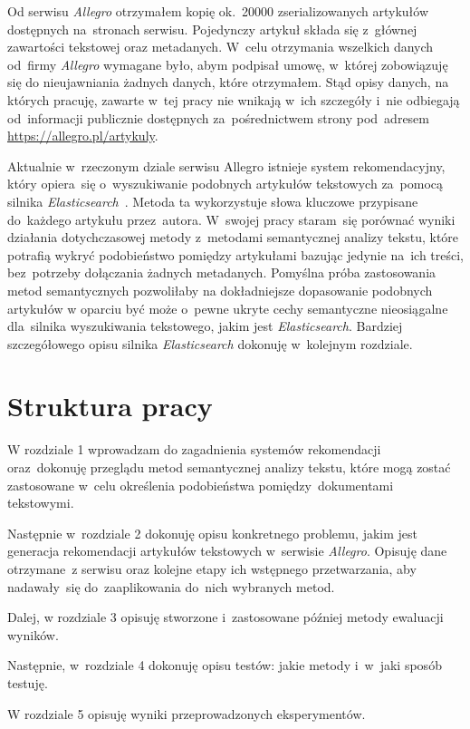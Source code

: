 \documentclass[pl]{minipw} %
\begin{document}
Od serwisu \textit{Allegro} otrzymałem kopię ok.~20000 zserializowanych artykułów dostępnych na~stronach serwisu. Pojedynczy artykuł składa się z~głównej zawartości tekstowej oraz metadanych. W~celu otrzymania wszelkich danych od~firmy \textit{Allegro} wymagane było, abym podpisał umowę, w~której zobowiązuję się do nieujawniania żadnych danych, które otrzymałem. Stąd opisy danych, na których pracuję, zawarte w~tej pracy nie wnikają w~ich szczegóły i~nie odbiegają od~informacji publicznie dostępnych za~pośrednictwem strony pod~adresem \url{https://allegro.pl/artykuly}.

Aktualnie w~rzeczonym dziale serwisu Allegro istnieje system rekomendacyjny, który opiera~się o~wyszukiwanie podobnych artykułów tekstowych za~pomocą silnika \textit{Elasticsearch}~\cite{elastic}. Metoda ta wykorzystuje słowa kluczowe przypisane do~każdego artykułu przez~autora. W~swojej pracy staram~się porównać wyniki działania dotychczasowej metody z~metodami semantycznej analizy tekstu, które potrafią wykryć podobieństwo pomiędzy artykułami bazując jedynie na~ich treści, bez~potrzeby dołączania żadnych metadanych. Pomyślna próba zastosowania metod semantycznych pozwoliłaby na dokładniejsze dopasowanie podobnych artykułów w oparciu być może o~pewne ukryte cechy semantyczne nieosiągalne dla~silnika wyszukiwania tekstowego, jakim jest \textit{Elasticsearch}. Bardziej szczegółowego opisu silnika \textit{Elasticsearch} dokonuję w~kolejnym rozdziale.

\section{Struktura pracy}
W rozdziale 1 wprowadzam do zagadnienia systemów rekomendacji oraz~dokonuję przeglądu metod semantycznej analizy tekstu, które mogą zostać zastosowane w~celu określenia podobieństwa pomiędzy~dokumentami tekstowymi.

Następnie w~rozdziale 2 dokonuję opisu konkretnego problemu, jakim jest generacja rekomendacji artykułów tekstowych w~serwisie \textit{Allegro}. Opisuję dane otrzymane~z serwisu oraz kolejne etapy ich wstępnego przetwarzania, aby nadawały~się do~zaaplikowania do~nich wybranych metod.

Dalej, w rozdziale 3 opisuję stworzone i~zastosowane później metody ewaluacji wyników.

Następnie, w~rozdziale 4 dokonuję opisu testów: jakie metody i~w~jaki sposób testuję.

W rozdziale 5 opisuję wyniki przeprowadzonych eksperymentów.
\end{document}
